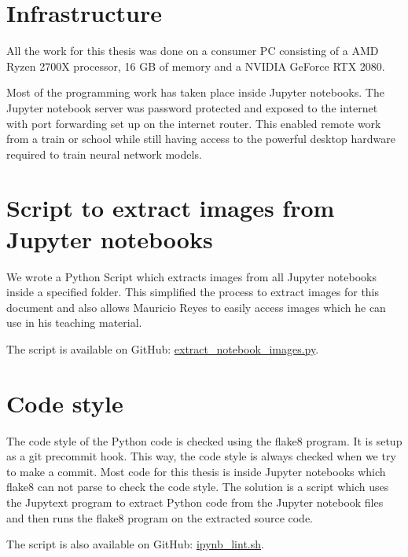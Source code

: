 \label{chapter_infrastructure}
\section{Infrastructure}
All the work for this thesis was done on a consumer PC consisting of a AMD Ryzen 2700X processor, 16 GB of memory and a NVIDIA GeForce RTX 2080.

Most of the programming work has taken place inside Jupyter notebooks. The Jupyter notebook server was password protected and exposed to the internet with port forwarding set up on the internet router. This enabled remote work from a train or school while still having access to the powerful desktop hardware required to train neural network models.

\section{Script to extract images from Jupyter notebooks}

We wrote a Python Script which extracts images from all Jupyter notebooks inside a specified folder. This simplified the process to extract images for this document and also allows Mauricio Reyes to easily access images which he can use in his teaching material.

The script is available on GitHub: \href{https://github.com/andef4/thesis-code/blob/master/extract_notebook_images.py}{extract\_notebook\_images.py}.

\section{Code style}
The code style of the Python code is checked using the flake8 program. It is setup as a git precommit hook. This way, the code style is always checked when we try to make a commit. Most code for this thesis is inside Jupyter notebooks which flake8 can not parse to check the code style. The solution is a script which uses the Jupytext \cite{jupytext} program to extract Python code from the Jupyter notebook files and then runs the flake8 program on the extracted source code.

The script is also available on GitHub: \href{https://github.com/andef4/thesis-code/blob/master/ipynb_lint.sh}{ipynb\_lint.sh}.
